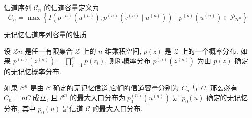 \begin{definition}
    信道序列 $ \mathscr{C}_{n} $ 的信道容量定义为
$$
C_{n}=\max \left\{I\left(p^{(n)}\left(u^{(n)}\right) ; p^{(n)}\left(v^{(n)} \mid u^{(n)}\right)\right) \mid p^{(n)}\left(u^{(n)}\right) \in \mathscr{P}_{\mathscr{U}^{n}}\right\}
$$
\end{definition}

无记忆信道序列容量的性质
\begin{definition}
    设 $ \mathscr{Z} n $ 是任一有限集合 $ \mathscr{Z} $ 上的 $ n $ 维乘积空间, $ p(z) $ 是 $ \mathscr{Z} $ 上的一个概率分布. 如果 $ p^{(n)}\left(z^{(n)}\right)=\prod\limits_{i=1}^{n} p\left(z_{i}\right) $, 则称概率分布 $ p^{(n)}\left(z^{(n)}\right) $ 为由 $ p(z) $ 确定的无记忆概率分布.
\end{definition}

\begin{theorem}
    如果 $ \mathscr{C}^{n} $ 是由 $ \mathscr{C} $ 确定的无记忆信道,它们的信道容量分别为 $ C_{n} $ 与 $ C $, 那么必有 $ C_{n}=n C $ 成立, 且 $ \mathscr{C}^{n} $ 的最大入口分布为 $ p_{0}^{(n)}\left(u^{(n)}\right) $ 是 $ p_{0}(u) $ 确定的无记忆分布, 其中 $ p_{0}(u) $ 是信道 $ \mathscr{C} $ 的最大入口分布.
\end{theorem}


















